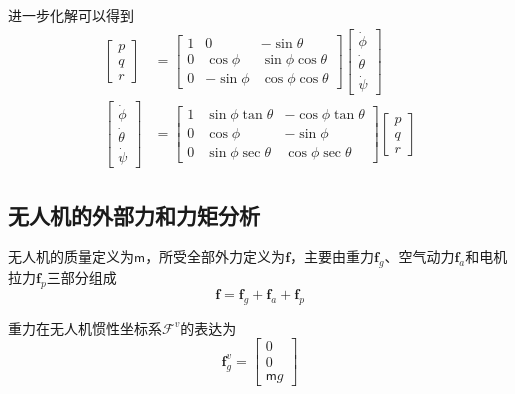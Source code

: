 进一步化解可以得到
\begin{align}
\begin{bmatrix} p \\ q \\ r \end{bmatrix}  &=   \begin{bmatrix}
1 &  0   & -\sin \theta      \\
0 &  \cos \phi  & \sin \phi \cos \theta \\	
0 & -\sin \phi   & \cos \phi \cos \theta
\end{bmatrix} \begin{bmatrix} \dot{\phi} \\ \dot{\theta} \\ \dot{\psi} \end{bmatrix} \\
\begin{bmatrix} \dot{\phi} \\ \dot{\theta} \\ \dot{\psi} \end{bmatrix}  &=  \begin{bmatrix}
1 &  \sin \phi \tan \theta  & - \cos \phi \tan \theta      \\
0 & \cos \phi   & -\sin \phi \\
0  & \sin \phi \sec \theta & \cos \phi \sec \theta
\end{bmatrix} \begin{bmatrix} p \\ q \\ r \end{bmatrix}
\end{align}

\subsection{无人机的外部力和力矩分析}
无人机的质量定义为$\mathsf{m}$，所受全部外力定义为$\mathbf{f}$，主要由重力$\mathbf{f}_g$、空气动力$\mathbf{f}_a$和电机拉力$\mathbf{f}_p$三部分组成
\begin{equation}
\mathbf{f} = \mathbf{f}_g + \mathbf{f}_a + \mathbf{f}_p
\end{equation}

重力在无人机惯性坐标系$\mathcal{F}^v$的表达为
\begin{equation}
\mathbf{f}_g^v = \begin{bmatrix}0  \\ 0  \\ \mathsf{m}g  \end{bmatrix}
\end{equation}

